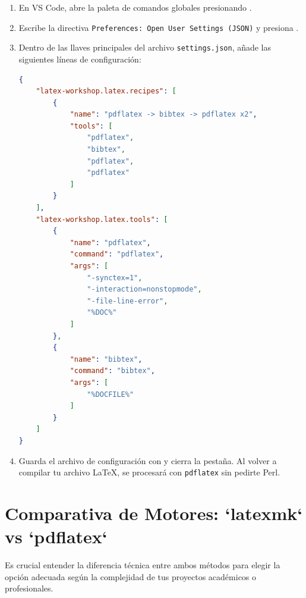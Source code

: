 \documentclass[
10pt, %
a4paper, %
oneside, %
headinclude,footinclude, %
BCOR5mm, %
]{scrartcl}
\begin{document}
\begin{enumerate}
	\item En VS Code, abre la paleta de comandos globales presionando .
	\item Escribe la directiva \texttt{Preferences: Open User Settings (JSON)} y presiona .
	\item Dentro de las llaves principales del archivo \texttt{settings.json}, añade las siguientes líneas de configuración:
	
	\begin{lstlisting}[language=json]
{
    "latex-workshop.latex.recipes": [
        {
            "name": "pdflatex -> bibtex -> pdflatex x2",
            "tools": [
                "pdflatex",
                "bibtex",
                "pdflatex",
                "pdflatex"
            ]
        }
    ],
    "latex-workshop.latex.tools": [
        {
            "name": "pdflatex",
            "command": "pdflatex",
            "args": [
                "-synctex=1",
                "-interaction=nonstopmode",
                "-file-line-error",
                "%DOC%"
            ]
        },
        {
            "name": "bibtex",
            "command": "bibtex",
            "args": [
                "%DOCFILE%"
            ]
        }
    ]
}
	\end{lstlisting}
	
	\item Guarda el archivo de configuración con  y cierra la pestaña. Al volver a compilar tu archivo LaTeX, se procesará con \texttt{pdflatex} sin pedirte Perl.
\end{enumerate}

\newpage
\section{Comparativa de Motores: `latexmk` vs `pdflatex`}

Es crucial entender la diferencia técnica entre ambos métodos para elegir la opción adecuada según la complejidad de tus proyectos académicos o profesionales.
\end{document}
